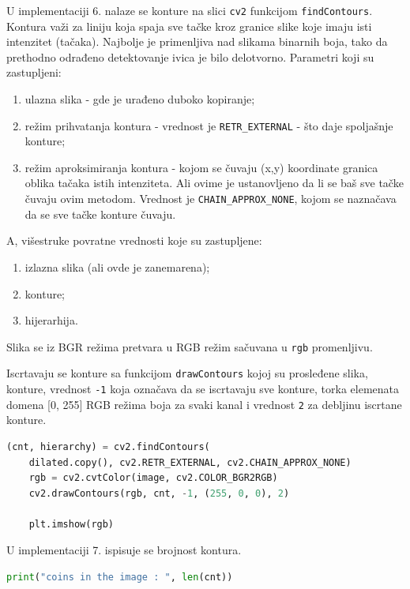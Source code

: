 \documentclass[fontsize=12bp, paper=a4]{scrarticle}
\begin{document}
U implementaciji 6. nalaze se konture na slici \verb|cv2| funkcijom \verb|findContours|.\cite{findContours} Kontura važi za liniju koja spaja sve tačke kroz granice slike koje imaju isti intenzitet (tačaka). Najbolje je primenljiva nad slikama binarnih boja, tako da prethodno odrađeno detektovanje ivica je bilo delotvorno. Parametri koji su zastupljeni:
\begin{enumerate}
    \item ulazna slika - gde je urađeno duboko kopiranje;
    \item režim prihvatanja kontura - vrednost je \verb|RETR_EXTERNAL| - što daje spoljašnje konture\cite{retr};
    \item režim aproksimiranja kontura - kojom se čuvaju (x,y) koordinate granica oblika tačaka istih intenziteta. Ali ovime je ustanovljeno da li se baš sve tačke čuvaju ovim metodom. Vrednost je \verb|CHAIN_APPROX_NONE|, kojom se naznačava da se sve tačke konture čuvaju.
\end{enumerate}
A, višestruke povratne vrednosti koje su zastupljene:
\begin{enumerate}
    \item izlazna slika (ali ovde je zanemarena);
    \item konture;
    \item hijerarhija.
\end{enumerate}

Slika se iz BGR režima pretvara u RGB režim sačuvana u \verb|rgb| promenljivu. 

Iscrtavaju se konture sa funkcijom \verb|drawContours| kojoj su prosleđene slika,\cite{drawContours} konture, vrednost \verb|-1| koja označava da se iscrtavaju sve konture, torka elemenata domena [0, 255] RGB režima boja za svaki kanal i vrednost \verb|2| za debljinu iscrtane konture.
    
\begin{lstlisting}[language=Python, caption={Spajanje kontura, isticanje kontura na slici, plotovanje novonastale slikeħ}]
    (cnt, hierarchy) = cv2.findContours( 
    dilated.copy(), cv2.RETR_EXTERNAL, cv2.CHAIN_APPROX_NONE) 
    rgb = cv2.cvtColor(image, cv2.COLOR_BGR2RGB) 
    cv2.drawContours(rgb, cnt, -1, (255, 0, 0), 2) 
    
    plt.imshow(rgb) 
\end{lstlisting}
    
U implementaciji 7. ispisuje se brojnost kontura.

\begin{lstlisting}[language=Python, caption={Ispis broja kontura}]
    print("coins in the image : ", len(cnt)) 
\end{lstlisting}
\end{document}
